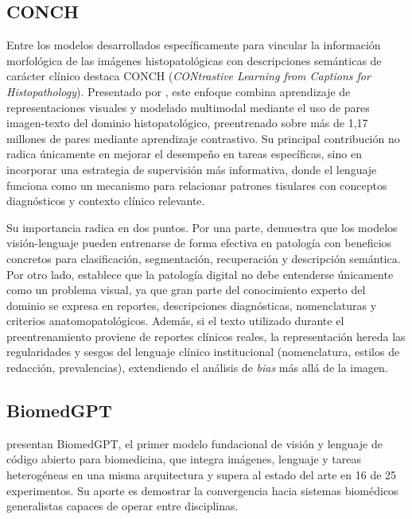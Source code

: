 \subsection{CONCH}

Entre los modelos desarrollados específicamente para vincular la información morfológica de las imágenes histopatológicas con descripciones semánticas de carácter clínico destaca CONCH (\textit{CONtrastive Learning from Captions for Histopathology}). Presentado por \textcite{Lu2024}, este enfoque combina aprendizaje de representaciones visuales y modelado multimodal mediante el uso de pares imagen-texto del dominio histopatológico, preentrenado sobre más de 1,17 millones de pares mediante aprendizaje contrastivo. Su principal contribución no radica únicamente en mejorar el desempeño en tareas específicas, sino en incorporar una estrategia de supervisión más informativa, donde el lenguaje funciona como un mecanismo para relacionar patrones tisulares con conceptos diagnósticos y contexto clínico relevante.

Su importancia radica en dos puntos. Por una parte, demuestra que los modelos visión-lenguaje pueden entrenarse de forma efectiva en patología con beneficios concretos para clasificación, segmentación, recuperación y descripción semántica. Por otro lado, establece que la patología digital no debe entenderse únicamente como un problema visual, ya que gran parte del conocimiento experto del dominio se expresa en reportes, descripciones diagnósticas, nomenclaturas y criterios anatomopatológicos. Además, si el texto utilizado durante el preentrenamiento proviene de reportes clínicos reales, la representación hereda las regularidades y sesgos del lenguaje clínico institucional (nomenclatura, estilos de redacción, prevalencias), extendiendo el análisis de \textit{bias} más allá de la imagen.

\subsection{BiomedGPT}

\textcite{Zhang2024} presentan BiomedGPT, el primer modelo fundacional de visión y lenguaje de código abierto para biomedicina, que integra imágenes, lenguaje y tareas heterogéneas en una misma arquitectura y supera al estado del arte en 16 de 25 experimentos. Su aporte es demostrar la convergencia hacia sistemas biomédicos generalistas capaces de operar entre disciplinas.

